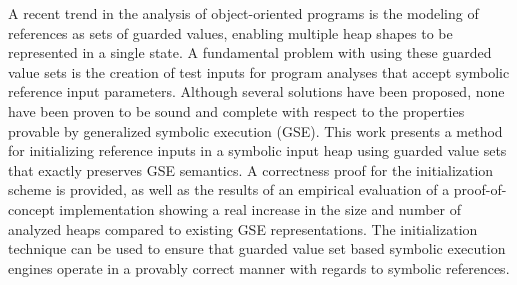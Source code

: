 A recent trend in the analysis of object-oriented programs is the
modeling of references as sets of guarded values, enabling multiple
heap shapes to be represented in a single state. A fundamental problem
with using these guarded value sets is the creation of test inputs for
program analyses that accept symbolic reference input parameters. Although
several solutions have been proposed, none have been proven to be
sound and complete with respect to the properties provable by
generalized symbolic execution (GSE). This work presents a method for
initializing reference inputs in a symbolic input heap using guarded
value sets that exactly preserves GSE semantics. A correctness proof
for the initialization scheme is provided, as well as the results of
an empirical evaluation of a proof-of-concept implementation showing a real increase in the size and number of analyzed heaps compared to existing GSE representations. The
initialization technique can be used to ensure that guarded value set
based symbolic execution engines operate in a provably correct manner
with regards to symbolic references.



